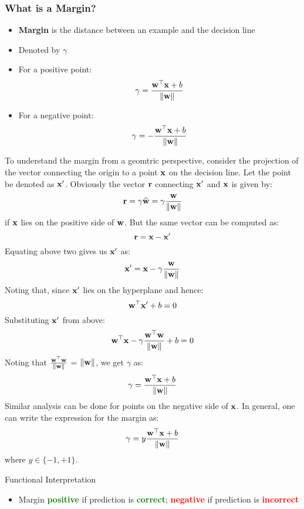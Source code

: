 \documentclass[10pt]{beamer}
\begin{document}
\begin{frame}
      {
        \frametitle{What is a Margin?}
      }
\begin{itemize}
\item {\bf Margin} is the distance between an example and the decision line
\item Denoted by $\gamma$
\item For a positive point:
  \[
  \gamma = \frac{{\bf w}^\top{\bf x} + b}{\Vert {\bf w} \Vert}
  \]
\item For a negative point:
  \[
  \gamma = -\frac{{\bf w}^\top{\bf x} + b}{\Vert {\bf w} \Vert}
  \]
\end{itemize}
    {
      To understand the margin from a geomtric perspective, consider the projection of the vector connecting the origin to a  point ${\bf x}$ on the decision line. Let the point be denoted as ${\bf x}'$. Obviously the vector ${\bf r}$ connecting ${\bf x}'$ and ${\bf x}$ is given by:
      \[
      {\bf r} = \gamma\widehat{\bf w} = \gamma\frac{\bf w}{\Vert {\bf w} \Vert}
      \]
      if ${\bf x}$ lies on the positive side of ${\bf w}$. But the same vector can be computed as:
      \[
      {\bf r} = {\bf x} - {\bf x}'
      \]
      Equating above two gives us ${\bf x}'$ as:
      \[
      {\bf x}' = {\bf x} - \gamma\frac{\bf w}{\Vert {\bf w} \Vert}
      \]
      Noting that, since ${\bf x}'$ lies on the hyperplane and hence:
      \[
      {\bf w}^\top{\bf x}' + b = 0
      \]
      Substituting ${\bf x}'$ from above:
      \[
      {\bf w}^\top{\bf x} - \gamma\frac{{\bf w}^\top{\bf w}}{\Vert {\bf w} \Vert} + b = 0
      \]
      Noting that $\frac{{\bf w}^\top{\bf w}}{\Vert {\bf w} \Vert}$ = $\Vert {\bf w} \Vert$, we get $\gamma$ as:
      \begin{equation}
      \gamma = \frac{{\bf w}^\top{\bf x} + b}{\Vert {\bf w} \Vert}
      \label{eqn:posmargin}
      \end{equation}
      Similar analysis can be done for points on the negative side of ${\bf x}$. In general, one can write the expression for the margin as:
      \begin{equation}
      \gamma = y\frac{{\bf w}^\top{\bf x} + b}{\Vert {\bf w} \Vert}
      \label{eqn:negmargin}
      \end{equation}
      where $y \in \{-1,+1\}$.
    }
    \begin{block}{Functional Interpretation}
      \begin{itemize}
        \item Margin \textcolor{green}{\bf positive} if prediction is \textcolor{green}{\bf correct}; \textcolor{red}{\bf negative} if prediction is \textcolor{red}{\bf incorrect}
      \end{itemize}
    \end{block}
\end{frame}
\end{document}
